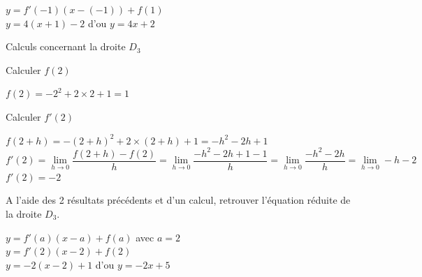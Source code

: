 \documentclass[12pt,a4paper]{article}  %
\begin{document}
\begin{enumMet}
\begin{enumMet}
\begin{corrBox}
			$y=f'(-1)(x-(-1))+f(1)$\\
			$y=4(x+1)-2$ d'ou $y=4x+2$	
		\end{corrBox} 
	\end{enumMet}
	\item {} Calculs concernant la droite $D_3$
	\begin{enumMet}
		\item {} Calculer $f(2)$ \quad {}
		\begin{corrBox}
			$f(2)=-2^{2}+2\times 2+1=1$	
		\end{corrBox}
		\item {} Calculer $f'(2)$ \quad {}
		\begin{corrBox}
			$f(2+h)=-(2+h)^{2}+2\times (2+h)+1=-h^2-2h+1$\\
			$f'(2)=\lim\limits_{h \rightarrow 0} \dfrac{f(2+h)-f(2)}{h}=\lim\limits_{h \rightarrow 0} \dfrac{-h^2-2h+1-1}{h}=\lim\limits_{h \rightarrow 0} \dfrac{-h^2-2h}{h}=\lim\limits_{h \rightarrow 0} -h-2$\\
			$f'(2)=-2$
		\end{corrBox}
		\item {} A l'aide des 2 résultats précédents et d'un calcul, retrouver l'équation réduite de la droite $D_3$. \quad {} 
		\begin{corrBox}
			$y=f'(a)(x-a)+f(a)$ avec $a=2$\\
			$y=f'(2)(x-2)+f(2)$\\
			$y=-2(x-2)+1$ d'ou $y=-2x+5$	
		\end{corrBox}
	\end{enumMet}
	
\end{enumMet}
\end{document}
